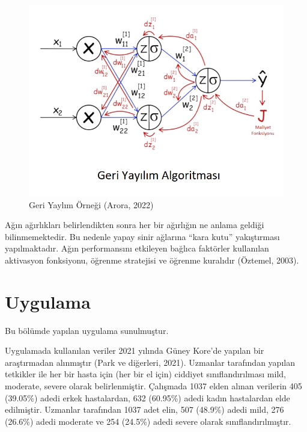 \documentclass[12pt,twoside]{deuthesis}
\begin{document}
\begin{figure}

{\centering \includegraphics[width=1\linewidth,height=0.4\textheight]{figure/back_prob} 

}

\caption{Geri Yaylım Örneği (Arora, 2022)}\label{fig:unnamed-chunk-12}
\end{figure}
Ağın ağırlıkları belirlendikten sonra her bir ağırlığın ne anlama geldiği bilinmemektedir. Bu nedenle yapay sinir ağlarına ``kara kutu'' yakıştırması yapılmaktadır. Ağın performansını etkileyen bağlıca faktörler kullanılan aktivasyon fonksiyonu, öğrenme stratejisi ve öğrenme kuralıdır (Öztemel, 2003).

\hypertarget{uygulama}{%
\chapter{Uygulama}\label{uygulama}}

Bu bölümde yapılan uygulama sunulmuştur.\\
\hspace*{0.333em}

Uygulamada kullanılan veriler 2021 yılında Güney Kore'de yapılan bir araştırmadan alınmıştır (Park ve diğerleri, 2021). Uzmanlar tarafından yapılan tetkikler ile her bir hasta için (her bir el için) ciddiyet sınıflandırılması mild, moderate, severe olarak belirlenmiştir. Çalışmada 1037 elden alınan verilerin 405 (39.05\%) adedi erkek hastalardan, 632 (60.95\%) adedi kadın hastalardan elde edilmiştir. Uzmanlar tarafından 1037 adet elin, 507 (48.9\%) adedi mild, 276 (26.6\%) adedi moderate ve 254 (24.5\%) adedi severe olarak sınıflandırılmıştır.
\end{document}
